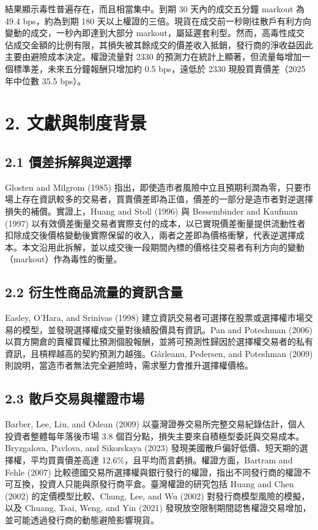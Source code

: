 \documentclass[12pt,a4paper]{article}
\begin{document}
結果顯示毒性普遍存在，而且相當集中。到期 30 天內的成交五分鐘 markout 為 49.4 bps，約為到期 180 天以上權證的三倍。現貨在成交前一秒剛往散戶有利方向變動的成交，一秒內即達到大部分 markout，屬延遲套利型。然而，高毒性成交佔成交金額的比例有限，其損失被其餘成交的價差收入抵銷，發行商的淨收益因此主要由避險成本決定。權證流量對 2330 的預測力在統計上顯著，但流量每增加一個標準差，未來五分鐘報酬只增加約 0.5 bps，遠低於 2330 現股買賣價差（2025 年中位數 35.5 bps）。


\section*{2. 文獻與制度背景}

\subsection*{2.1 價差拆解與逆選擇}

Glosten and Milgrom (1985) 指出，即使造市者風險中立且預期利潤為零，只要市場上存在資訊較多的交易者，買賣價差即為正值，價差的一部分是造市者對逆選擇損失的補償。實證上，Huang and Stoll (1996) 與 Bessembinder and Kaufman (1997) 以有效價差衡量交易者實際支付的成本，以已實現價差衡量提供流動性者扣除成交後價格變動後實際保留的收入，兩者之差即為價格衝擊，代表逆選擇成本。本文沿用此拆解，並以成交後一段期間內標的價格往交易者有利方向的變動（markout）作為毒性的衡量。

\subsection*{2.2 衍生性商品流量的資訊含量}

Easley, O'Hara, and Srinivas (1998) 建立資訊交易者可選擇在股票或選擇權市場交易的模型，並發現選擇權成交量對後續股價具有資訊。Pan and Poteshman (2006) 以買方開倉的賣權買權比預測個股報酬，並將可預測性歸因於選擇權交易者的私有資訊，且槓桿越高的契約預測力越強。Gârleanu, Pedersen, and Poteshman (2009) 則說明，當造市者無法完全避險時，需求壓力會推升選擇權價格。

\subsection*{2.3 散戶交易與權證市場}

Barber, Lee, Liu, and Odean (2009) 以臺灣證券交易所完整交易紀錄估計，個人投資者整體每年落後市場 3.8 個百分點，損失主要來自積極型委託與交易成本。Bryzgalova, Pavlova, and Sikorskaya (2023) 發現美國散戶偏好低價、短天期的選擇權，平均買賣價差高達 12.6\%，且平均而言虧損。權證方面，Bartram and Fehle (2007) 比較德國交易所選擇權與銀行發行的權證，指出不同發行商的權證不可互換，投資人只能與原發行商平倉。臺灣權證的研究包括 Huang and Chen (2002) 的定價模型比較、Chung, Lee, and Wu (2002) 對發行商模型風險的模擬，以及 Chuang, Tsai, Weng, and Yin (2021) 發現放空限制期間認售權證交易增加，並可能透過發行商的動態避險影響現貨。
\end{document}
